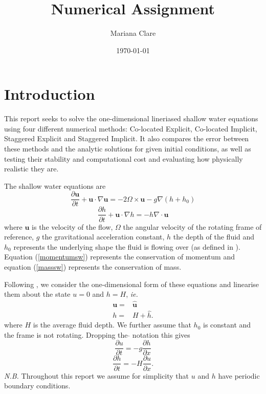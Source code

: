 \documentclass[a4paper, 10.5pt, notitlepage]{article}
\title{Numerical Assignment}
\author{Mariana Clare}
\date{\today}
\begin{document}
	
\maketitle
\thispagestyle{empty}
\section{Introduction}
This report seeks to solve the one-dimensional lineriased shallow water equations using four different numerical methods: Co-located Explicit, Co-located Implicit, Staggered Explicit and Staggered Implicit. It also compares the error between these methods and the analytic solutions for given initial conditions, as well as testing their stability and computational cost and evaluating how physically realistic they are.

The shallow water equations are
\begin{equation}\label{momentumsw}
\frac{\partial \mathbf{u}}{\partial t} + \mathbf{u}\cdot\nabla\mathbf{u} = - 2\Omega \times\mathbf{u} - g\nabla (h + h_{0})
\end{equation}
\begin{equation}\label{masssw}
\frac{\partial h}{\partial t} + \mathbf{u}\cdot\nabla h = - h \nabla \cdot \mathbf{u}
\end{equation}
where $\mathbf{u}$ is the velocity of the flow, $\Omega$ the angular velocity of the rotating frame of reference, $g$ the gravitational acceleration constant, $h$ the depth of the fluid and $h_{0}$ represents the underlying shape the fluid is flowing over (as defined in \cite{MPE textbook}). Equation (\ref{momentumsw}) represents the conservation of momentum and equation (\ref{masssw}) represents the conservation of mass.

Following \cite{MPE textbook}, we consider the one-dimensional form of these equations and linearise them about the state $u = 0$ and $h = H$, \textit{ie.}
\begin{eqnarray}
\mathbf{u} =  & \mathbf{\hat{u}}
 \\   \nonumber
h = &  H + \hat{h} .
\end{eqnarray}
where $H$ is the average fluid depth. We further assume that $h_{0}$ is constant and the frame is not rotating. Dropping the $\hat{}$ notation this gives
\begin{equation}\label{linearisedsw1}
\frac{\partial u}{\partial t} = - g \frac{\partial h}{\partial x}
\end{equation}
\begin{equation}\label{linearisedsw2}
\frac{\partial h}{\partial t} = - H \frac{\partial u}{\partial x}.
\end{equation}
\textit{N.B.} Throughout this report we assume for simplicity that $u$ and $h$ have periodic boundary conditions.
\end{document}

